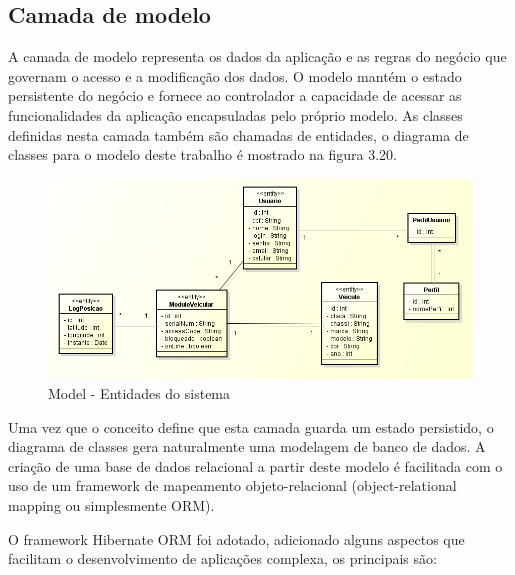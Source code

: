\subsection{Camada de modelo}

A camada de modelo representa os dados da aplicação e as regras do negócio que governam o acesso e a modificação dos dados. O modelo mantém o estado persistente do negócio e fornece ao controlador a capacidade de acessar as funcionalidades da aplicação encapsuladas pelo próprio modelo. As classes definidas nesta camada também são chamadas de entidades, o diagrama de classes para o modelo deste trabalho é mostrado na figura 3.20.

\begin{figure}[!htb]
	\centering
	\includegraphics[width=\textwidth]{figures/model.png}
	\caption{Model - Entidades do sistema}
	\label{}
\end{figure}

Uma vez que o conceito define que esta camada guarda um estado persistido, o diagrama de classes gera naturalmente uma modelagem de banco de dados. A criação de uma base de dados relacional a partir deste modelo é facilitada com o uso de um framework de mapeamento objeto-relacional (object-relational mapping ou simplesmente ORM).

O framework Hibernate ORM foi adotado, adicionado alguns aspectos que facilitam o desenvolvimento de aplicações complexa, os principais são:

